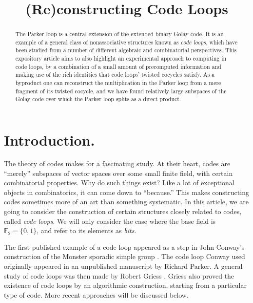 \documentclass{article}
\theoremstyle{plain}
\theoremstyle{definition}
\def \FF {\mathbb{F}}
\begin{document}
\title{(Re)constructing Code Loops}
\author{%
}

\maketitle

\begin{abstract}
The Parker loop is a central extension of the extended binary Golay code. It is an example of a general class of nonassociative structures known as \emph{code loops}, which have been studied from a number of different algebraic and combinatorial perspectives.
This expository article aims to also highlight an experimental approach to computing in code loops, by a combination of a small amount of precomputed information and making use of the rich identities that code loops' twisted cocycles satisfy.
As a byproduct one can reconstruct the multiplication in the Parker loop from a mere fragment of its twisted cocycle, and we have found relatively large subspaces of the Golay code over which the Parker loop splits as a direct product.
\end{abstract}


\section{Introduction.}

The theory of codes makes for a fascinating study. 
At their heart, codes are ``merely'' subspaces of vector spaces over some small finite field, with certain combinatorial properties.
Why do such things exist? Like a lot of exceptional objects in combinatorics, it can come down to ``because.''
This makes constructing codes sometimes more of an art than something systematic.
In this article, we are going to consider the construction of certain structures closely related to codes, called \emph{code loops}. 
We will only consider the case where the base field is $\FF_2=\{0,1\}$, and refer to its elements as \emph{bits}.

The first published example of a code loop appeared as a step in John Conway's construction of the Monster sporadic simple group \cite{Conway}. 
The code loop Conway used originally appeared in an unpublished manuscript by Richard Parker.
A general study of code loops was then made by Robert Griess \cite{Griess}.
Griess also proved the existence of code loops by an algorithmic construction, starting from a particular type of code.
More recent approaches will be discussed below.
\end{document}
